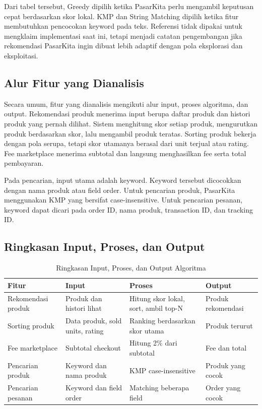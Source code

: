Dari tabel tersebut, Greedy dipilih ketika PasarKita perlu mengambil keputusan cepat berdasarkan skor lokal. KMP dan String Matching dipilih ketika fitur membutuhkan pencocokan keyword pada teks. Referensi \textcite{Umami2021} tidak dipakai untuk mengklaim implementasi saat ini, tetapi menjadi catatan pengembangan jika rekomendasi PasarKita ingin dibuat lebih adaptif dengan pola eksplorasi dan eksploitasi.

\subsection{Alur Fitur yang Dianalisis}

Secara umum, fitur yang dianalisis mengikuti alur input, proses algoritma, dan output. Rekomendasi produk menerima input berupa daftar produk dan histori produk yang pernah dilihat. Sistem menghitung skor setiap produk, mengurutkan produk berdasarkan skor, lalu mengambil produk teratas. Sorting produk bekerja dengan pola serupa, tetapi skor utamanya berasal dari unit terjual atau rating. Fee marketplace menerima subtotal dan langsung menghasilkan fee serta total pembayaran.

Pada pencarian, input utama adalah keyword. Keyword tersebut dicocokkan dengan nama produk atau field order. Untuk pencarian produk, PasarKita menggunakan KMP yang bersifat case-insensitive. Untuk pencarian pesanan, keyword dapat dicari pada order ID, nama produk, transaction ID, dan tracking ID.

\subsection{Ringkasan Input, Proses, dan Output}

\begin{table}[htbp]
    \caption{Ringkasan Input, Proses, dan Output Algoritma}
    \label{tab:ipo-algoritma}
    \small
    \begin{tabularx}{\textwidth}{@{} >{\raggedright\arraybackslash}X >{\raggedright\arraybackslash}X >{\raggedright\arraybackslash}X >{\raggedright\arraybackslash}X @{}}
    \toprule
    \textbf{Fitur} & \textbf{Input} & \textbf{Proses} & \textbf{Output} \\
    \midrule
    Rekomendasi produk & Produk dan histori lihat & Hitung skor lokal, sort, ambil top-N & Produk rekomendasi \\
    Sorting produk & Data produk, sold units, rating & Ranking berdasarkan skor utama & Produk terurut \\
    Fee marketplace & Subtotal checkout & Hitung 2\% dari subtotal & Fee dan total \\
    Pencarian produk & Keyword dan nama produk & KMP case-insensitive & Produk yang cocok \\
    Pencarian pesanan & Keyword dan field order & Matching beberapa field & Order yang cocok \\
    \bottomrule
    \end{tabularx}
\end{table}

